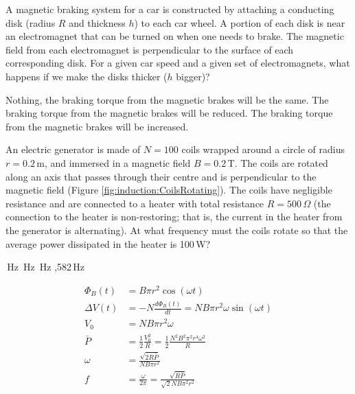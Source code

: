 \question A magnetic braking system for a car is constructed by attaching a conducting disk (radius $R$ and thickness $h$) to each car wheel. A portion of each disk is near an electromagnet that can be turned on when one needs to brake. The magnetic field from each electromagnet is perpendicular to the surface of each corresponding disk. For a given car speed and a given set of electromagnets, what happens if we make the disks thicker ($h$ bigger)?
\begin{checkboxes}
\choice Nothing, the braking torque from the magnetic brakes will be the same.
\choice The braking torque from the magnetic brakes will be reduced.
\CorrectChoice The braking torque from the magnetic brakes will be increased. \correct
\end{checkboxes}

\question \label{q:induction:CoilsRotating} An electric generator is made of $N=100$ coils wrapped around a circle of radius $r=0.2$\,m, and immersed in a magnetic field $B=0.2$\,T. The coils are rotated along an axis that passes through their centre and is perpendicular to the magnetic field (Figure \ref{fig:induction:CoilsRotating}). The coils have negligible resistance and are connected to a heater with total resistance $R=500\,\Omega$ (the connection to the heater is non-restoring; that is, the current in the heater from the generator is alternating). At what frequency must the coils rotate so that the average power dissipated in the heater is 100\,W?
\begin{checkboxes}
\,Hz \correct
{} \,Hz
\,Hz
,582\,Hz
\end{checkboxes}
\begin{solution}
\begin{align*}
\Phi_B(t)&= B\pi r^2\cos(\omega t)\\
\Delta V(t) &= -N\frac{d\Phi_B(t)}{dt}=NB\pi r^2 \omega \sin(\omega t)\\
V_0 &= NB\pi r^2 \omega \\
\bar P&=\frac{1}{2}\frac{V_0^2}{R}=\frac{1}{2}\frac{N^2B^2\pi^2 r^4 \omega^2}{R}\\
\omega &= \frac{\sqrt{2R\bar P}}{NB\pi r^2} \\
f&=\frac{\omega}{2\pi}=\frac{\sqrt{R\bar P}}{\sqrt 2 NB\pi^2 r^2}
\end{align*}
\end{solution}
%
%
